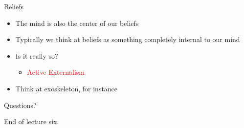 \documentclass{beamer}
\begin{document}
\begin{frame}
{\centerline{Beliefs}}
\begin{itemize}
    \item The mind is also the center of our beliefs
    \item Typically we think at beliefs as something completely internal to our mind
    \item Is it really so?
    \begin{itemize}
    \item \textcolor{red}{Active Externalism}
\end{itemize} 
     \item Think at exoskeleton, for instance 
\end{itemize} 



\end{frame}



\begin{frame}
{\centerline{Questions?}}
\vspace{1cm}
\begin{center}
    \LARGE{End of lecture six.}
\end{center}

\end{frame}
\end{document}

